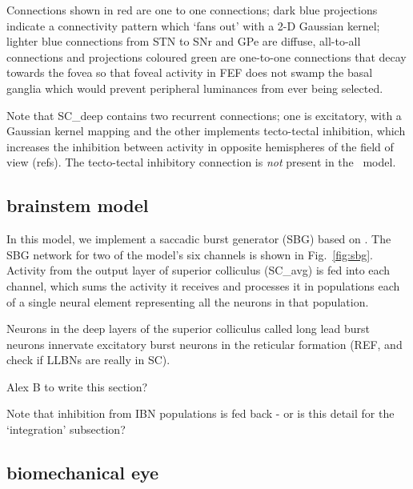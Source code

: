 \documentclass{frontiersSCNS}
\begin{document}
Connections shown in red are one to one connections; dark blue
projections indicate a connectivity pattern which `fans out' with a
2-D Gaussian kernel; lighter blue connections from STN to SNr and GPe
are diffuse, all-to-all connections and projections coloured green are
one-to-one connections that decay towards the fovea so that foveal
activity in FEF does not swamp the basal ganglia which would prevent
peripheral luminances from ever being selected.

Note that SC\_deep contains two recurrent connections; one is
excitatory, with a Gaussian kernel mapping and the other implements
tecto-tectal inhibition, which increases the inhibition between
activity in opposite hemispheres of the field of view (refs). The
tecto-tectal inhibitory connection is \emph{not} present in
the \ccg~model.


\subsection{brainstem model}

In this model, we implement a saccadic burst generator (SBG) based
on \cite{gancarz_neural_1998}. The SBG network for two of the model's
six channels is shown in Fig.~\ref{fig:sbg}. Activity from the output
layer of superior colliculus (SC\_avg) is fed into each channel, which
sums the activity it receives and processes it in populations each of
a single neural element representing all the neurons in that
population.

Neurons in the deep
layers of the superior colliculus called long lead burst neurons
innervate excitatory burst neurons in the reticular formation (REF,
and check if LLBNs are really in SC).

Alex B to write this section?

Note that inhibition from IBN populations is fed back - or is this
detail for the `integration' subsection?

\subsection{biomechanical eye}
\end{document}
